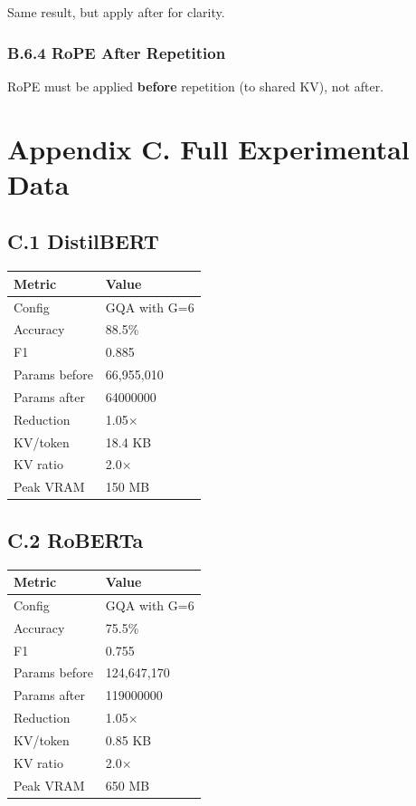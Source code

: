 Same result, but apply after for clarity.

\subsubsection{B.6.4 RoPE After Repetition}

RoPE must be applied \textbf{before} repetition (to shared KV), not after.


\section{Appendix C. Full Experimental Data}

\subsection{C.1 DistilBERT}

\begin{table}[H]
\centering
\small
\begin{tabular}{ll}
\toprule
\textbf{Metric} & \textbf{Value} \\
\midrule
Config & GQA with G=6 \\
Accuracy & 88.5\% \\
F1 & 0.885 \\
Params before & 66,955,010 \\
Params after & 64000000 \\
Reduction & 1.05$\times$ \\
KV/token & 18.4 KB \\
KV ratio & 2.0$\times$ \\
Peak VRAM & 150 MB \\
\bottomrule
\end{tabular}
\end{table}

\subsection{C.2 RoBERTa}

\begin{table}[H]
\centering
\small
\begin{tabular}{ll}
\toprule
\textbf{Metric} & \textbf{Value} \\
\midrule
Config & GQA with G=6 \\
Accuracy & 75.5\% \\
F1 & 0.755 \\
Params before & 124,647,170 \\
Params after & 119000000 \\
Reduction & 1.05$\times$ \\
KV/token & 0.85 KB \\
KV ratio & 2.0$\times$ \\
Peak VRAM & 650 MB \\
\bottomrule
\end{tabular}
\end{table}

